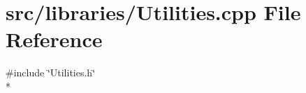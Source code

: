 \section{src/libraries/\-Utilities.cpp File Reference}
\label{_utilities_8cpp}
{\ttfamily \#include \char`\"{}Utilities.\-h\char`\"{}}\\*
